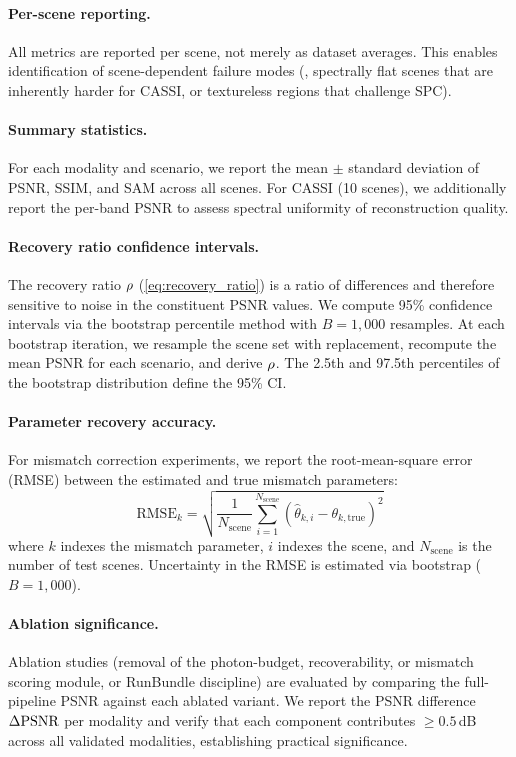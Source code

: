 \paragraph{Per-scene reporting.}
All metrics are reported per scene, not merely as dataset averages.  This
enables identification of scene-dependent failure modes (\eg{}, spectrally
flat scenes that are inherently harder for CASSI, or textureless regions
that challenge SPC).

\paragraph{Summary statistics.}
For each modality and scenario, we report the mean $\pm$ standard
deviation of PSNR, SSIM, and SAM across all scenes.  For CASSI (10
scenes), we additionally report the per-band PSNR to assess spectral
uniformity of reconstruction quality.

\paragraph{Recovery ratio confidence intervals.}
The recovery ratio $\rho$ (\cref{eq:recovery_ratio}) is a ratio
of differences and therefore sensitive to noise in the constituent PSNR
values.  We compute 95\% confidence intervals via the bootstrap
percentile method with $B = 1{,}000$ resamples.  At each bootstrap
iteration, we resample the scene set with replacement, recompute the
mean PSNR for each scenario, and derive $\rho$.  The 2.5th
and 97.5th percentiles of the bootstrap distribution define the 95\% CI.

\paragraph{Parameter recovery accuracy.}
For mismatch correction experiments, we report the root-mean-square error
(RMSE) between the estimated and true mismatch parameters:
\begin{equation}
  \text{RMSE}_k = \sqrt{\frac{1}{N_{\text{scene}}}
    \sum_{i=1}^{N_{\text{scene}}}
    (\hat\theta_{k,i} - \theta_{k,\text{true}})^2}
\end{equation}
where $k$ indexes the mismatch parameter, $i$ indexes the scene, and
$N_{\text{scene}}$ is the number of test scenes.  Uncertainty in the RMSE
is estimated via bootstrap ($B = 1{,}000$).

\paragraph{Ablation significance.}
Ablation studies (removal of the photon-budget, recoverability, or
mismatch scoring module, or RunBundle discipline) are evaluated by comparing the
full-pipeline PSNR against each ablated variant.  We report the PSNR
difference $\Delta\mathrm{PSNR}$ per modality and verify that each component
contributes $\geq 0.5$\,dB across all validated modalities, establishing
practical significance.


